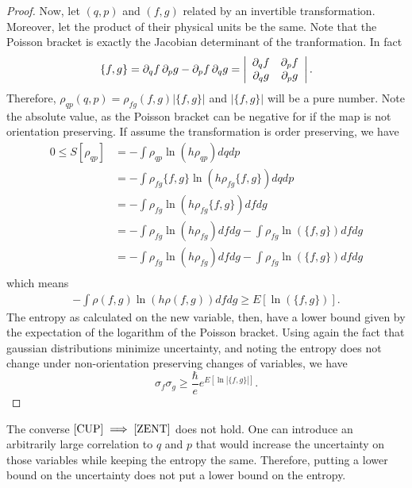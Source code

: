 \documentclass{techbrief}
\begin{document}
\begin{proof}
Now, let $(q,p)$ and $(f,g)$ related by an invertible transformation. Moreover, let the product of their physical units be the same. Note that the Poisson bracket is exactly the Jacobian determinant of the tranformation. In fact
\begin{equation}
	\{f, g\} = \partial_q f \, \partial_p g - \partial_p f \, \partial_q g = \left|\begin{array}{ c c }
		\partial_q f & \partial_p f \\
		\partial_q g & \partial_p g \\
	\end{array} \right|.
\end{equation}
Therefore, $\rho_{qp}(q,p) = \rho_{fg}(f,g) |\{f,g\}|$ and $|\{f,g\}|$ will be a pure number. Note the absolute value, as the Poisson bracket can be negative for if the map is not orientation preserving. If assume the transformation is order preserving, we have
\begin{align*}
	0 \leq S[\rho_{qp}] &= - \int \rho_{qp} \ln (h \rho_{qp}) dq dp \\ &=  - \int \rho_{fg} \{f,g\} \ln (h \rho_{fg} \{f,g\} ) dq dp \\
	&= - \int \rho_{fg} \ln (h \rho_{fg} \{f,g\} ) df dg \\
	&= - \int \rho_{fg} \ln (h \rho_{fg} ) df dg - \int \rho_{fg} \ln ( \{f,g\} ) df dg \\
	&= - \int \rho_{fg} \ln (h \rho_{fg} ) df dg - \int \rho_{fg} \ln ( \{f,g\} ) df dg \\
\end{align*}
which means
\begin{align*}
	- \int \rho(f,g) \ln (h \rho(f,g) ) df dg \geq E[ \ln ( \{f,g\} ) ].
\end{align*}
The entropy as calculated on the new variable, then, have a lower bound given by the expectation of the logarithm of the Poisson bracket. Using again the fact that gaussian distributions minimize uncertainty, and noting the entropy does not change under non-orientation preserving changes of variables, we have
\begin{equation}
	\sigma_f \sigma_g \geq \frac{\hbar}{e} e^{E[\ln |\{f,g\}|]}.
\end{equation}
\end{proof}

\begin{remark}
	The converse $\ref{CUP} \implies \ref{ZENT}$ does not hold. One can introduce an arbitrarily large correlation to $q$ and $p$ that would increase the uncertainty on those variables while keeping the entropy the same. Therefore, putting a lower bound on the uncertainty does not put a lower bound on the entropy.
\end{remark}
\end{document}
